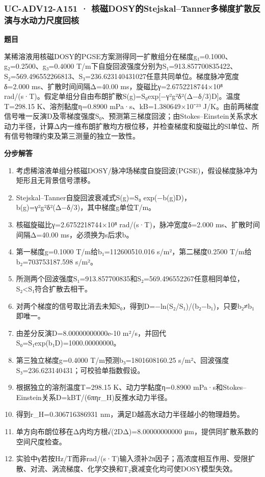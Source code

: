 \documentclass[UTF8,11pt,a4paper]{ctexart}
\begin{document}
\subsubsection*{UC-ADV12-A151 · 核磁DOSY的Stejskal–Tanner多梯度扩散反演与水动力尺度回核}
\noindent\textbf{题目}\par
某稀溶液用核磁DOSY的PGSE方案测得同一扩散组分在梯度g₁=0.1000、g₂=0.2500、g₃=0.4000 T/m下自旋回波强度分别为S₁=913.857700835422、S₂=569.496552266813、S₃=236.623140431027任意共同单位。梯度脉冲宽度δ=2.000 ms、扩散时间间隔Δ=40.00 ms，旋磁比γ=2.6752218744×10⁸ rad/(s·T)。假定单组分自由布朗扩散S(g)=S₀exp[−γ²g²δ²(Δ−δ/3)D]。温度T=298.15 K、溶剂黏度η=0.8900 mPa·s、kB=1.380649×10⁻²³ J/K。由前两梯度信号唯一反演D及零梯度强度S₀、预测第三梯度回波；由Stokes–Einstein关系求水动力半径，计算Δ内一维布朗扩散均方根位移，并检查梯度和旋磁比的SI单位、所有信号物理约束及第三测量的独立一致性。\par
\medskip\noindent\textbf{分步解答}
\begin{enumerate}
\item 考虑稀溶液单组分核磁DOSY/脉冲场梯度自旋回波(PGSE)，假设梯度脉冲为矩形且无背景信号漂移。
\item Stejskal–Tanner自旋回波衰减式S(g)=S₀ exp(−b(g)D)，b(g)=γ²g²δ²(Δ−δ/3)，其中梯度g单位T/m。
\item 核磁旋磁比γ=2.6752218744×10⁸ rad/(s·T)，脉冲宽度δ=2.000 ms、扩散时间间隔Δ=40.00 ms，必须换为s后求b。
\item 第一梯度g=0.1000 T/m给b₁=112600510.016 s/m²，第二梯度0.2500 T/m给b₂=703753187.598 s/m²。
\item 所测两个回波强度S₁=913.857700835和S₂=569.496552267任意相同单位，S₂<S₁符合扩散去相干。
\item 对两个梯度的信号取比消去未知S₀，得到D=−ln(S₂/S₁)/(b₂−b₁)，只要b₂≠b₁即唯一。
\item 由差分反演D=8.00000000000e-10 m²/s，并回代S₀=S₁exp(b₁D)=1000.00000000。
\item 第三独立梯度g=0.4000 T/m预测b₃=1801608160.25 s/m²、回波强度S₃=236.623140431；可校验单指数假设。
\item 根据独立的溶剂温度T=298.15 K、动力学黏度η=0.8900 mPa·s和Stokes–Einstein关系D=kBT/(6πηr\_H)反推水动力半径。
\item 得到r\_H=0.306716386931 nm，满足D越高水动力半径越小的物理趋势。
\item 单方向布朗位移在Δ内均方根√(2DΔ)=8.00000000000 μm，提供同扩散系数的空间尺度检查。
\item 实验中γ若按Hz/T而非rad/(s·T)输入须补2π因子；高浓度相互作用、受限扩散、对流、涡流梯度、化学交换和T₂衰减变化均可使DOSY模型失效。
\end{enumerate}
\end{document}
